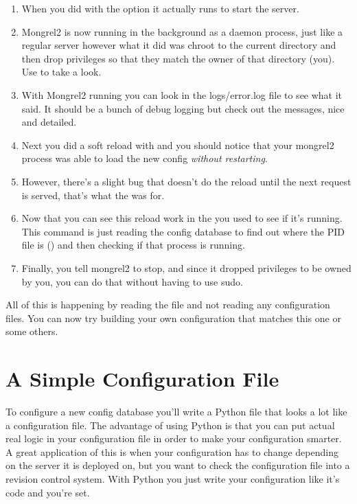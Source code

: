 \begin{enumerate}
\item When you did  with the  option it actually runs
     to start the server.
\item Mongrel2 is now running in the background as a daemon process, just like a regular server
    however what it did was chroot to the current directory and then drop privileges so that 
    they match the owner of that directory (you).  Use  to take a look.
\item With Mongrel2 running you can look in the logs/error.log file to see what it said.  It should
    be a bunch of debug logging but check out the messages, nice and detailed.
\item Next you did a soft reload with  and you should notice that your mongrel2
    process was able to load the new config \emph{without restarting}.
\item However, there's a slight bug that doesn't do the reload until the next request is served, that's
    what the  was for.
\item Now that you can see this reload work in the  you used  to
    see if it's running.  This command is just reading the config database to find out where the PID file
    is () and then checking if that process is running.
\item Finally, you tell mongrel2 to stop, and since it dropped privileges to be owned by you, you can do
    that without having to use sudo.
\end{enumerate}

All of this is happening by reading the  file and not reading any configuration
files.  You can now try building your own configuration that matches this one or some others.


\section{A Simple Configuration File}

To configure a new config database you'll write a Python file that looks a lot like
a configuration file.  The advantage of using Python is that you can put actual
real logic in your configuration file in order to make your configuration smarter.
A great application of this is when your configuration has to change depending on the
server it is deployed on, but you want to check the configuration file into a revision
control system.  With Python you just write your configuration like it's code and
you're set.

